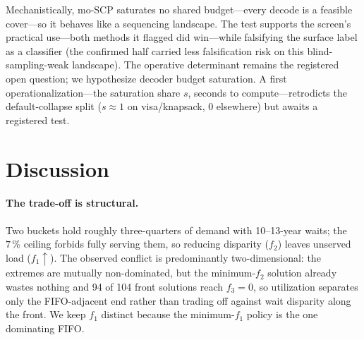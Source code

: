 \documentclass[runningheads]{llncs}
\begin{document}
Mechanistically, mo-SCP saturates no shared budget---every decode is a feasible cover---so it behaves like a sequencing landscape. The test supports the screen's practical use---both methods it flagged did win---while falsifying the surface label as a classifier (the confirmed half carried less falsification risk on this blind-sampling-weak landscape). The operative determinant remains the registered open question; we hypothesize decoder budget saturation. A first operationalization---the saturation share $s$, seconds to compute---retrodicts the default-collapse split ($s\approx1$ on visa/knapsack, $0$ elsewhere) but awaits a registered test.

\section{Discussion}
\label{sec:discussion}

\paragraph{The trade-off is structural.}
Two buckets hold roughly three-quarters of demand with 10--13-year waits; the $7\,\%$ ceiling forbids fully serving them, so reducing disparity ($f_2$) leaves unserved load ($f_1\!\uparrow$). The observed conflict is predominantly two-dimensional: the extremes are mutually non-dominated, but the minimum-$f_2$ solution already wastes nothing and 94 of 104 front solutions reach $f_3=0$, so utilization separates only the FIFO-adjacent end rather than trading off against wait disparity along the front. We keep $f_1$ distinct because the minimum-$f_1$ policy is the one dominating FIFO.
\end{document}
